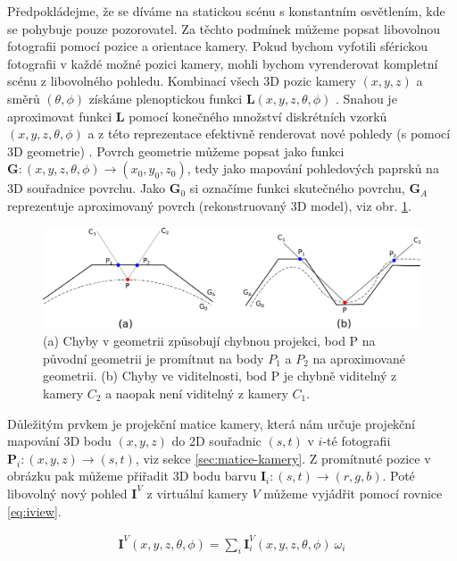 \documentclass[11pt,twoside,a4paper]{book}
\begin{document}
Předpokládejme, že se díváme na statickou scénu s konstantním osvětlením, kde se pohybuje pouze pozorovatel. Za těchto podmínek můžeme popsat libovolnou fotografii pomocí pozice a orientace kamery. Pokud bychom vyfotili sférickou fotografii v každé možné pozici kamery, mohli bychom vyrenderovat kompletní scénu z libovolného pohledu. Kombinací všech 3D pozic kamery $(x, y, z)$ a směrů $(\theta, \phi)$ získáme plenoptickou funkci $\textbf{L}(x, y, z, \theta, \phi)$ \cite{Adelson91}. Snahou je aproximovat funkci \textbf{L} pomocí konečného množství diskrétních vzorků $(x, y, z, \theta, \phi)$ a z této reprezentace efektivně renderovat nové pohledy (s pomocí 3D geometrie) \cite{floating-textures}. Povrch geometrie můžeme popsat jako funkci $\textbf{G} : (x, y, z, \theta, \phi) \to (x_0, y_0, z_0)$, tedy jako mapování pohledových paprsků na 3D souřadnice povrchu. Jako $\textbf{G}_0$ si označíme funkci skutečného povrchu, $\textbf{G}_A$  reprezentuje aproximovaný povrch (rekonstruovaný 3D model), viz obr. \ref{fig:projection-error}.

\begin{figure}[hb]
\begin{center}
\includegraphics[width=\textwidth]{figures/projection-error}
\caption{(a) Chyby v geometrii způsobují chybnou projekci, bod P na původní geometrii je promítnut na body $P_1$ a $P_2$ na aproximované geometrii. (b) Chyby ve viditelnosti, bod P je chybně viditelný z kamery $C_2$ a naopak není viditelný z kamery $C_1$.}
\label{fig:projection-error}
\end{center}
\end{figure}

Důležitým prvkem je projekční matice kamery, která nám určuje projekční mapování 3D bodu $(x, y, z)$ do 2D souřadnic $(s, t)$ v $i$-té fotografii  $\textbf{P}_i: (x, y, z) \to (s, t)$, viz sekce \ref{sec:matice-kamery}.  Z promítnuté pozice v obrázku pak můžeme přiřadit 3D bodu barvu $\textbf{I}_i : (s, t) \to (r, g, b)$. Poté libovolný nový pohled $\textbf{I}^V$ z virtuální kamery $V$ můžeme vyjádřit pomocí rovnice \ref{eq:iview}.

\begin{align}
\label{eq:iview}
\textbf{I}^V(x, y, z, \theta, \phi) = \sum_{i} \textbf{I}_{i}^{V}(x, y, z, \theta, \phi)~\omega_i
\end{align}
\end{document}
